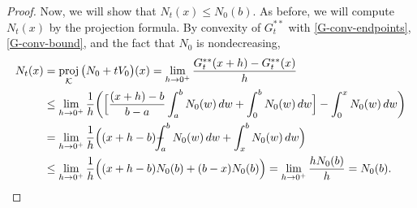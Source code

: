 \documentclass[11pt]{article}
\numberwithin{equation}{section}
\def\Xint#1{\mathchoice
{\XXint\displaystyle\textstyle{#1}}%
{\XXint\textstyle\scriptstyle{#1}}%
{\XXint\scriptstyle\scriptscriptstyle{#1}}%
{\XXint\scriptscriptstyle\scriptscriptstyle{#1}}%
   \!\int}
\def\XXint#1#2#3{{\setbox0=\hbox{$#1{#2#3}{\int}$}
\vcenter{\hbox{$#2#3$}}\kern-.5\wd0}}
\def\dashint{\Xint-}
\DeclareMathOperator{\proj}{proj}
\begin{document}
\begin{proof}
Now, we will show that $N_t(x)\leq N_0(b)$. As before, we will compute $N_t(x)$ by the projection formula. By convexity of $G_t^{**}$ with \eqref{G-conv-endpoints}, \eqref{G-conv-bound}, and the fact that $N_0$ is nondecreasing,
\begin{align*}
    N_t(x)&=\proj_{\mathcal{K}}\big(N_0+tV_0\big)(x)=\lim_{h\to0^+}\frac{G_t^{**}(x+h)-G_t^{**}(x)}{h} 
    \\
    &\leq \lim_{h\to0^+}\frac{1}{h}\bigg(\Big[\frac{(x+h)-b}{b-a}\int_a^b N_0(w) \, dw+\int_0^b N_0(w) \, dw\Big]-\int_0^x N_0(w) \, dw\bigg)
    \\
    &=\lim_{h\to0^+}\frac{1}{h}\Big((x+h-b)\dashint_a^b N_0(w) \, dw+\int_x^b N_0(w) \,dw\Big)
    \\
    &\leq \lim_{h\to0^+}\frac{1}{h}\Big((x+h-b)N_0(b)+(b-x)N_0(b)\Big)=\lim_{h\to0^+}\frac{hN_0(b)}{h}=N_0(b). \qedhere
\end{align*}

\end{proof}
\end{document}
